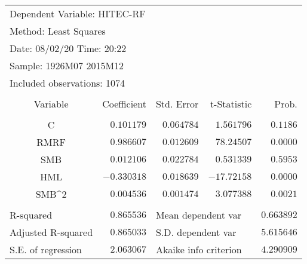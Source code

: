 \documentclass[12pt]{article}
\numberwithin{equation}{section} %
\begin{document}
\begin{table}[!htbp]
\centering
\begin{tabular}{lrrrr}
\multicolumn{3}{l}{Dependent Variable: HITEC-RF}&\multicolumn{1}{c}{}&\multicolumn{1}{c}{}\\
\multicolumn{2}{l}{Method: Least Squares}&\multicolumn{1}{c}{}&\multicolumn{1}{c}{}&\multicolumn{1}{c}{}\\
\multicolumn{2}{l}{Date: 08/02/20   Time: 20:22}&\multicolumn{1}{c}{}&\multicolumn{1}{c}{}&\multicolumn{1}{c}{}\\
\multicolumn{2}{l}{Sample: 1926M07 2015M12}&\multicolumn{1}{c}{}&\multicolumn{1}{c}{}&\multicolumn{1}{c}{}\\
\multicolumn{3}{l}{Included observations: 1074}&\multicolumn{1}{c}{}&\multicolumn{1}{c}{}\\
[4.5pt] \hline \\ [-4.5pt]
\multicolumn{1}{c}{Variable}&\multicolumn{1}{r}{Coefficient}&\multicolumn{1}{r}{Std. Error}&\multicolumn{1}{r}{t-Statistic}&\multicolumn{1}{r}{Prob.}\\
[4.5pt] \hline \\ [-4.5pt]
\multicolumn{1}{c}{C}&\multicolumn{1}{r}{$0.101179$}&\multicolumn{1}{r}{$0.064784$}&\multicolumn{1}{r}{$1.561796$}&\multicolumn{1}{r}{$0.1186$}\\
\multicolumn{1}{c}{RMRF}&\multicolumn{1}{r}{$0.986607$}&\multicolumn{1}{r}{$0.012609$}&\multicolumn{1}{r}{$78.24507$}&\multicolumn{1}{r}{$0.0000$}\\
\multicolumn{1}{c}{SMB}&\multicolumn{1}{r}{$0.012106$}&\multicolumn{1}{r}{$0.022784$}&\multicolumn{1}{r}{$0.531339$}&\multicolumn{1}{r}{$0.5953$}\\
\multicolumn{1}{c}{HML}&\multicolumn{1}{r}{$-0.330318$}&\multicolumn{1}{r}{$0.018639$}&\multicolumn{1}{r}{$-17.72158$}&\multicolumn{1}{r}{$0.0000$}\\
\multicolumn{1}{c}{SMB\textasciicircum 2}&\multicolumn{1}{r}{$0.004536$}&\multicolumn{1}{r}{$0.001474$}&\multicolumn{1}{r}{$3.077388$}&\multicolumn{1}{r}{$0.0021$}\\
[4.5pt] \hline \\ [-4.5pt]
\multicolumn{1}{l}{R-squared}&\multicolumn{1}{r}{$0.865536$}&\multicolumn{2}{l}{Mean dependent var}&\multicolumn{1}{r}{$0.663892$}\\
\multicolumn{1}{l}{Adjusted R-squared}&\multicolumn{1}{r}{$0.865033$}&\multicolumn{2}{l}{S.D. dependent var}&\multicolumn{1}{r}{$5.615646$}\\
\multicolumn{1}{l}{S.E. of regression}&\multicolumn{1}{r}{$2.063067$}&\multicolumn{2}{l}{Akaike info criterion}&\multicolumn{1}{r}{$4.290909$}\\

\end{tabular}
\end{table}
\end{document}
